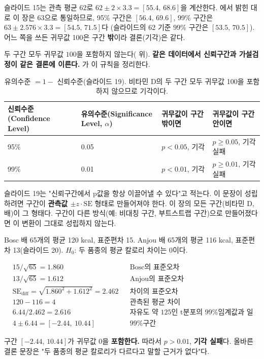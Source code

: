 \begin{pitfall}
\label{pit:pv-vitd-ci}
슬라이드 15는 관측 평균 62로 $62\pm2\times3.3=[55.4,\,68.6]$을 계산한다.
에서 밝힌 대로 이 장은 63으로 통일하므로, 95\%
구간은 $[56.4,\,69.6]$, 99\% 구간은 $63\pm2.576\times3.3=[54.5,\,71.5]$다
(슬라이드의 62 기준 99\% 구간은 $[53.5,\,70.5]$). 어느 쪽을 쓰든 귀무값
100은 구간 \textbf{밖}이라 결론(기각)은 같다.
\end{pitfall}

두 구간 모두 귀무값 $100$을 포함하지 않는다( 위).
\textbf{같은 데이터에서 신뢰구간과 가설검정이 같은 결론에 이른다.}
가 이 규칙을 정리한다.

\begin{table}[H]\centering
\begin{tabularx}{\linewidth}{@{}l l X X@{}}
\toprule
신뢰수준(Confidence Level) & 유의수준(Significance Level, $\alpha$) & 귀무값이 구간 밖이면 & 귀무값이 구간 안이면 \\
\midrule
95\% & 0.05 & $p<0.05$, 기각 & $p\ge0.05$, 기각 실패 \\
\midrule
99\% & 0.01 & $p<0.01$, 기각 & $p\ge0.01$, 기각 실패 \\
\bottomrule
\end{tabularx}
\caption{유의수준 $=1-$ 신뢰수준(슬라이드 19). 비타민 D의 두 구간 모두
귀무값 100을 포함하지 않으므로 기각이다.}
\label{tab:pv-ci-vs-p}
\end{table}

슬라이드 19는 "신뢰구간에서 p값을 항상 이끌어낼 수 있다"고 적는다. 이
문장이 성립하려면 구간이 \textbf{관측값 $\pm z\cdot\mathrm{SE}$} 형태로
만들어져야 한다. 이 장의 모든 구간(비타민 D, 배)이 그 형태다. 구간이 다른
방식(예: 비대칭 구간, 부트스트랩 구간)으로 만들어졌다면 이 변환이 그대로
성립하지 않는다.

\begin{example}
\label{ex:pv-pears}
Bosc 배 65개의 평균 120 kcal, 표준편차 15. Anjou 배 65개의 평균 116
kcal, 표준편차 13(슬라이드 20). $H_0$: 두 품종의 평균 칼로리 차이는
$0$이다.

\begin{align*}
  &15/\sqrt{65} = 1.860 && \text{Bosc의 표준오차}\\
  &13/\sqrt{65} = 1.612 && \text{Anjou의 표준오차}\\
  &\mathrm{SE}_{\text{diff}} = \sqrt{1.860^2+1.612^2} = 2.462 && \text{차이의 표준오차}\\
  &120-116 = 4 && \text{관측된 평균 차이}\\
  &6.44/2.462 = 2.616 && \text{자유도 약 125인 t분포의 99\% 임계값과 일치}\\
  &4 \pm 6.44 = [-2.44,\ 10.44] && \text{99\% 구간}
\end{align*}

구간 $[-2.44,\,10.44]$가 귀무값 $0$을 \textbf{포함한다.} 따라서 $p>0.01$,
\textbf{기각 실패}다. 올바른 결론 문장은 "두 품종의 평균 칼로리가
다르다고 말할 근거가 없다"다.
\end{example}

